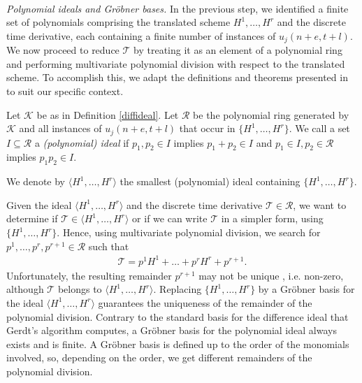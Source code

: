 \documentclass[runningheads]{llncs}
\newcommand{\1}{\chi}
\begin{document}
\\
\emph{Polynomial ideals and Gr{\"o}bner bases.}\label{polid}
In the previous step, we identified a finite set of polynomials comprising the translated scheme ${H^1,\ldots,H^r}$ and the discrete time derivative, each containing a finite number of instances of $u_j(n+e,t+l)$. We now proceed to reduce $\mathcal{T}$ by treating it as an element of a polynomial ring and performing multivariate polynomial division with respect to the translated scheme. To accomplish this, we adapt the definitions and theorems presented in \cite{hibi13} to suit our specific context.
\begin{definition}
	Let $\mathcal{K}$ be as in Definition \ref{diffideal}. Let $\mathcal{R}$ be the polynomial ring generated by $\mathcal{K}$ and all instances of $u_j(n+e,t+l)$ that occur in $\{H^1,\ldots,H^r\}$.
	We call a set $ I\subseteq \mathcal{R}$ a \emph{(polynomial) ideal} if
	$p_1,p_2\in I$ implies $p_1+p_2\in I$ and
	$p_1\in I,p_2\in\mathcal{R}$ implies $p_1p_2\in I$.
\end{definition}
\begin{definition}
	We denote by $\langle H^1,\ldots,H^r\rangle$ the smallest (polynomial) ideal containing $\{H^1,\ldots,H^r\}$.
\end{definition}
Given the ideal $\langle H^1,\ldots,H^r\rangle$ and the discrete time derivative $\mathcal{T}\in\mathcal{R}$, we want to determine if $\mathcal{T}\in\langle H^1,\ldots,H^r\rangle$ or if we can write $\mathcal{T}$ in a simpler form, using $\{H^1,\ldots,H^r\}$.
Hence, using multivariate polynomial division, we search for $p^1,\ldots,p^r,p^{r+1}\in\mathcal{R}$ such that
\begin{gather*}
	\mathcal{T}=p^1H^1+\ldots+p^rH^r+p^{r+1}.
\end{gather*}
Unfortunately, the resulting remainder $p^{r+1}$ may not be unique \cite[page 14, Example 1.2.3]{hibi13}, i.e. non-zero, although $\mathcal{T}$ belongs to $\langle H^1,\ldots,H^r \rangle$. 
Replacing $\{H^1,\ldots,H^r\}$ by a Gr{\"o}bner basis for the ideal $\langle H^1,\ldots,H^r \rangle$ guarantees the uniqueness of the remainder of the polynomial division. 
Contrary to the standard basis for the difference ideal that Gerdt's algorithm computes, a Gr{\"o}bner basis for the polynomial ideal always exists and is finite.
A Gr{\"o}bner basis is defined up to the order of the monomials involved, so, depending on the order, we get different remainders of the polynomial division.
\end{document}
